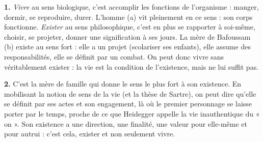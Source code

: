 \documentclass[11pt]{article}
\newcommand{\cle}[1]{{\popxbold\color{popdark}#1}}
\begin{document}
\begin{corrige}
\textbf{1.} \emph{Vivre} au sens biologique, c'est accomplir les fonctions de l'organisme : manger, dormir, se reproduire, durer. L'homme (a) vit pleinement en ce sens : son corps fonctionne. \emph{Exister} au sens philosophique, c'est en plus se rapporter à soi-même, choisir, se projeter, donner une signification à ses jours. La mère de Bafoussam (b) existe au sens fort : elle a un projet (scolariser ses enfants), elle assume des responsabilités, elle se définit par un combat. On peut donc vivre sans véritablement exister : la vie est la condition de l'existence, mais ne lui suffit pas.

\textbf{2.} C'est la mère de famille qui donne le sens le plus fort à son existence. En mobilisant la notion de \cle{sens de la vie} (et la thèse de Sartre), on peut dire qu'elle se définit par ses actes et son engagement, là où le premier personnage se laisse porter par le temps, proche de ce que Heidegger appelle la vie inauthentique du « on ». Son existence a une direction, une finalité, une valeur pour elle-même et pour autrui : c'est cela, exister et non seulement vivre.
\end{corrige}
\end{document}
